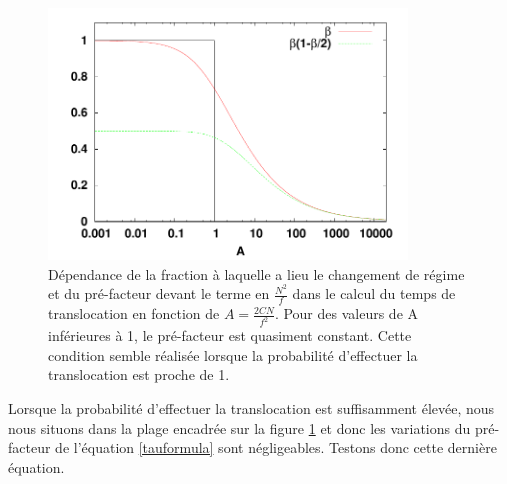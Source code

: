 \begin{figure}[H]
\begin{center}
\includegraphics[width=0.85\textwidth]{timebeta.pdf}

\caption[Préfacteur du temps de translocation]{Dépendance de la fraction à laquelle a lieu le changement de régime et du pré-facteur devant le terme en $\frac{N^2}{f}$ dans le calcul du temps de translocation en fonction de $A= \frac{2CN}{f^2}$. Pour des valeurs de A inférieures à 1, le pré-facteur est quasiment constant. Cette condition semble réalisée lorsque la probabilité d'effectuer la translocation est proche de 1.}
\label{timebeta}
\end{center}
\end{figure}

Lorsque la probabilité d'effectuer la translocation est suffisamment élevée, nous nous situons dans la plage encadrée sur la figure \ref{timebeta} et donc les variations du pré-facteur de l'équation \ref{tauformula} sont négligeables. Testons donc cette dernière équation.



